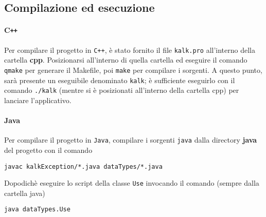\subsection{Compilazione ed esecuzione}
\paragraph{C\texttt{++}} Per compilare il progetto in \texttt{C++}, è stato fornito il file \texttt{kalk.pro}
all'interno della cartella \textbf{cpp}. Posizionarsi all'interno di quella cartella ed eseguire il comando
\texttt{qmake} per generare il Makefile, poi \texttt{make} per compilare i sorgenti. A questo punto, sar\`a presente
un eseguibile denominato \texttt{kalk}; è sufficiente eseguirlo con il comando \texttt{./kalk} (mentre si è posizionati
all'interno della cartella cpp) per lanciare l'applicativo.

\paragraph{Java} Per compilare il progetto in \texttt{Java}, compilare i sorgenti \texttt{java} dalla directory \textbf{java}
del progetto con il comando 
\begin{center}
    \texttt{javac kalkException/*.java dataTypes/*.java} \par
\end{center} 
Dopodichè eseguire lo script della classe \texttt{Use} invocando il comando (sempre dalla cartella java)
\begin{center}
    \texttt{java dataTypes.Use}
\end{center}
 